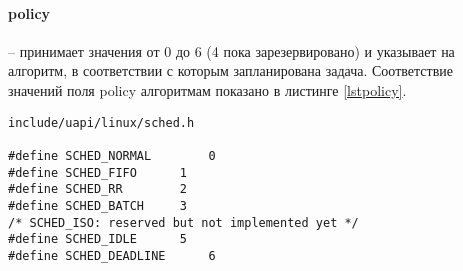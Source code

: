 







\paragraph*{policy} -- принимает значения от 0 до 6 (4 пока зарезервировано) и указывает на алгоритм, в соответствии с которым запланирована задача. Соответствие значений поля policy алгоритмам показано в листинге \ref{lstpolicy}.
\begin{lstlisting}[label=lstpolicy,caption=Соответствие значений поля policy алгоритмам планирования]
include/uapi/linux/sched.h

#define SCHED_NORMAL		0
#define SCHED_FIFO		1
#define SCHED_RR		2
#define SCHED_BATCH		3
/* SCHED_ISO: reserved but not implemented yet */
#define SCHED_IDLE		5
#define SCHED_DEADLINE		6
\end{lstlisting}

